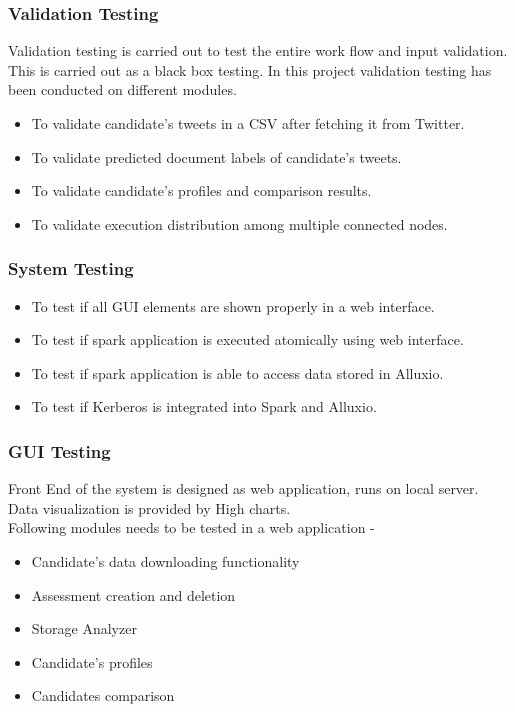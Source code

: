 \documentclass[oneside,a4paper,12pt]{pictreport}
\begin{document}
\subsubsection{Validation Testing}
Validation testing is carried out to test the entire work flow and input validation. This is carried out as a black box testing. In this project validation testing has been conducted on different modules.
\begin{itemize}
\item To validate candidate's tweets in a CSV after fetching it from Twitter.
\item To validate predicted document labels of candidate's tweets.
\item To validate candidate's profiles and comparison results.
\item To validate execution distribution among multiple connected nodes.
\end{itemize}

\subsubsection{System Testing}
\begin{itemize}
\item To test if all GUI elements are shown properly in a web interface.
\item To test if spark application is executed atomically using web interface.
\item To test if spark application is able to access data stored in Alluxio.
\item To test if Kerberos is integrated into Spark and Alluxio.
\end{itemize}

\subsubsection{GUI Testing}
Front End of the system is designed as web application, runs on local server. Data visualization is provided by High charts. \\
Following modules needs to be tested in a web application - 
\begin{itemize}
\item Candidate's data downloading functionality
\item Assessment creation and deletion
\item Storage Analyzer
\item Candidate's profiles
\item Candidates comparison 
\end{itemize}
\end{document}
